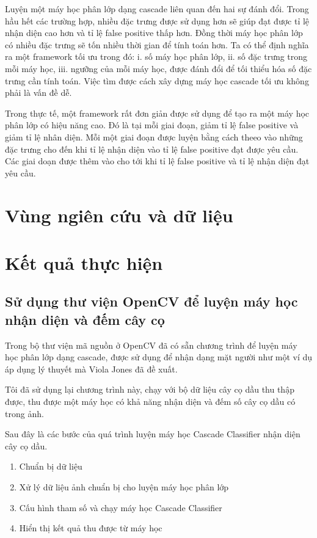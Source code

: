 \documentclass[14pt, oneside, a4paper, openany]{scrartcl}
\begin{document}
Luyện một máy học phân lớp dạng cascade liên quan đến hai sự đánh đổi. Trong hầu hết các trường hợp, nhiều đặc trưng được sử dụng hơn sẽ giúp đạt được tỉ lệ nhận diện cao hơn và tỉ lệ false positive thấp hơn. Đồng thời máy học phân lớp có nhiều đặc trưng sẽ tốn nhiều thời gian để tính toán hơn. Ta có thể định nghĩa ra một framework tối ưu trong đó: i. số máy học phân lớp, ii. số đặc trưng trong mỗi máy học, iii. ngưỡng của mỗi máy học, được đánh đổi để tối thiểu hóa số đặc trưng cần tính toán. Việc tìm được cách xây dựng máy học cascade tối ưu không phải là vấn đề dễ.

Trong thực tế, một framework rất đơn giản được sử dụng để tạo ra một máy học phân lớp có hiệu năng cao. Đó là tại mỗi giai đoạn, giảm tỉ lệ false positive và giảm tỉ lệ nhân diện. Mỗi một giai đoạn được luyện bằng cách theeo vào những đặc trưng cho đến khi tỉ lệ nhận diện vào tỉ lệ false positive đạt được yêu cầu. Các giai doạn được thêm vào cho tới khi tỉ lệ false positive và tỉ lệ nhận diện đạt yêu cầu.

\newpage
\section{Vùng ngiên cứu và dữ liệu}

\newpage
\section{Kết quả thực hiện}

\subsection{Sử dụng thư viện OpenCV để luyện máy học nhận diện và đếm cây cọ}
Trong bộ thư viện mã nguồn ở OpenCV đã có sẵn chương trình để luyện máy học phân lớp dạng cascade, được sử dụng để nhận dạng mặt người như một ví dụ áp dụng lý thuyết mà Viola Jones đã đề xuất.

Tôi đã sử dụng lại chương trình này, chạy với bộ dữ liệu cây cọ dầu thu thập được, thu được một máy học có khả năng nhận diện và đếm số cây cọ dầu có trong ảnh.

Sau đây là các bước của quá trình luyện máy học Cascade Classifier nhận diện cây cọ dầu.
\begin{enumerate}
	\item Chuẩn bị dữ liệu
	\item Xử lý dữ liệu ảnh chuẩn bị cho luyện máy học phân lớp
	\item Cấu hình tham số và chạy máy học Cascade Classifier
	\item Hiển thị kết quả thu được từ máy học
\end{enumerate}
\end{document}
